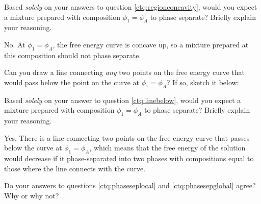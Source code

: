 \begin{activity}
\begin{ctqs}
\begin{enumerate}
			\end{enumerate}
			
		\question \label{ctq:phaseseplocal} Based \emph{solely} on your answers to question \ref{ctq:regionconcavity}, would you expect a mixture prepared with composition $\phi_1 = \phi_A$ to phase separate?  Briefly explain your reasoning.
					
					\begin{solution}[1.75in]
					
						No. At $\phi_1 = \phi_A$, the free energy curve is concave up, so a mixture prepared at this composition should not phase separate.
					
					\end{solution}
		
		\question \label{ctq:linebelow} Can you draw a line connecting \emph{any} two points on the free energy curve that would pass below the point on the curve at $\phi_1=\phi_A$?  If so, sketch it below:

			\begin{solution}[2.5in]
			\end{solution}
		
		\question \label{ctq:phasesepglobal} Based \emph{solely} on your answer to question \ref{ctq:linebelow}, would you expect a mixture prepared with composition $\phi_1 = \phi_A$ to phase separate?  Briefly explain your reasoning.
		
			\begin{solution}[1.5in]
			
				Yes.  There is a line connecting two points on the free energy curve that passes below the curve at $\phi_1 = \phi_A$, which means that the free energy of the solution would decrease if it phase-separated into two phases with compositions equal to those where the line connects with the curve.
				
			\end{solution}
		
		\question Do your answers to questions \ref{ctq:phaseseplocal} and \ref{ctq:phasesepglobal} agree?  Why or why not?
		

\end{ctqs}
\end{activity}
